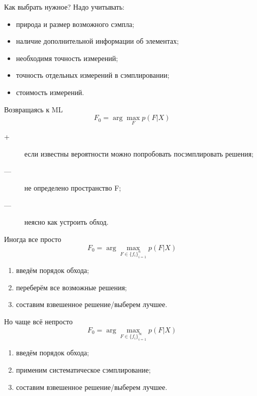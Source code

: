 \documentclass[14pt, fleqn, xcolor={dvipsnames, table}]{beamer}
\begin{document}
\begin{frame}{Как выбрать нужное?}
Надо учитывать:
\begin{itemize}
   \item природа и размер возможного сэмпла;
   \item наличие дополнительной информации об элементах;
   \item необходимя точность измерений;
   \item точность отдельных измерений в сэмплировании;
   \item стоимость измерений.
\end{itemize}
\end{frame}

\begin{frame}{Возвращаясь к ML}
$$
F_0 = \arg\max_F p(F|X)
$$
\begin{description}
  \item[\color{green}+] если известны вероятности можно попробовать посэмплировать решения;
  \item[\color{red}---] не определено пространство F;
  \item[\color{red}---] неясно как устроить обход.
\end{description}
\end{frame}

\begin{frame}{Иногда все просто}
$$
F_0 = \arg\max_{F \in \{f_i\}_{i=1}^n} p(F|X)
$$
\begin{enumerate}
  \item введём порядок обхода;
  \item переберём все возможные решения;
  \item составим взвешенное решение/выберем лучшее.
\end{enumerate}
\end{frame}

\begin{frame}{Но чаще всё непросто}
$$
F_0 = \arg\max_{F \in \{f_i\}_{i=1}^\infty} p(F|X)
$$
\begin{enumerate}
  \item введём порядок обхода;
  \item применим систематическое сэмплирование;
  \item составим взвешенное решение/выберем лучшее.
\end{enumerate}
\end{frame}
\end{document}
